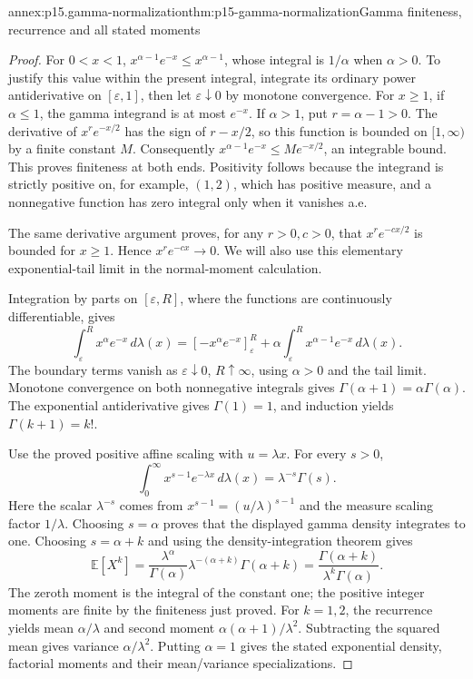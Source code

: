 \begin{annexitem}{annex:p15.gamma-normalization}{thm:p15-gamma-normalization}{Gamma finiteness, recurrence and all stated moments}
\begin{proof}
For \(0<x<1\), \(x^{\alpha-1}e^{-x}\leq x^{\alpha-1}\),
whose integral is \(1/\alpha\) when \(\alpha>0\).
To justify this value within the present integral, integrate its
ordinary power antiderivative on \([\varepsilon,1]\), then
let \(\varepsilon\downarrow0\) by monotone convergence.
For \(x\geq1\), if \(\alpha\leq1\), the gamma integrand
is at most \(e^{-x}\). If \(\alpha>1\), put \(r=\alpha-1>0\).
The derivative of \(x^r e^{-x/2}\) has the sign of \(r-x/2\),
so this function is bounded on \([1,\infty)\) by a finite
constant \(M\). Consequently
\(x^{\alpha-1}e^{-x}\leq M e^{-x/2}\), an integrable bound.
This proves finiteness at both ends. Positivity follows because
the integrand is strictly positive on, for example, \((1,2)\),
which has positive measure, and a nonnegative function has zero
integral only when it vanishes a.e.

The same derivative argument proves, for any \(r>0,c>0\), that
\(x^r e^{-cx/2}\) is bounded for \(x\geq1\). Hence
\(x^r e^{-cx}\to0\). We will also use this elementary
exponential-tail limit in the normal-moment calculation.

Integration by parts on \([\varepsilon,R]\), where the
functions are continuously differentiable, gives
\[
 \int_\varepsilon^R x^\alpha e^{-x}\,d\lambda(x)
   =[-x^\alpha e^{-x}]_\varepsilon^R
       +\alpha\int_\varepsilon^R x^{\alpha-1}e^{-x}\,d\lambda(x).
\]
The boundary terms vanish as \(\varepsilon\downarrow0\),
\(R\uparrow\infty\), using \(\alpha>0\) and the tail
limit. Monotone convergence on both nonnegative integrals gives
\(\Gamma(\alpha+1)=\alpha\Gamma(\alpha)\).
The exponential antiderivative gives \(\Gamma(1)=1\), and
induction yields \(\Gamma(k+1)=k!\).

Use the proved positive affine scaling with \(u=\lambda x\).
For every \(s>0\),
\[
 \int_0^\infty x^{s-1}e^{-\lambda x}\,d\lambda(x)
                         =\lambda^{-s}\Gamma(s).
\]
Here the scalar \(\lambda^{-s}\) comes from
\(x^{s-1}=(u/\lambda)^{s-1}\) and the measure scaling
factor \(1/\lambda\). Choosing \(s=\alpha\) proves
that the displayed gamma density integrates to one. Choosing
\(s=\alpha+k\) and using the density-integration theorem gives
\[
 \mathbb E[X^k]
  =\frac{\lambda^\alpha}{\Gamma(\alpha)}
       \lambda^{-(\alpha+k)}\Gamma(\alpha+k)
  =\frac{\Gamma(\alpha+k)}{\lambda^k\Gamma(\alpha)}.
\]
The zeroth moment is the integral of the constant one; the
positive integer moments are finite by the finiteness just proved.
For \(k=1,2\), the recurrence yields mean \(\alpha/\lambda\)
and second moment \(\alpha(\alpha+1)/\lambda^2\).
Subtracting the squared mean gives variance \(\alpha/\lambda^2\).
Putting \(\alpha=1\) gives the stated exponential density,
factorial moments and their mean/variance specializations.
\end{proof}
\end{annexitem}

